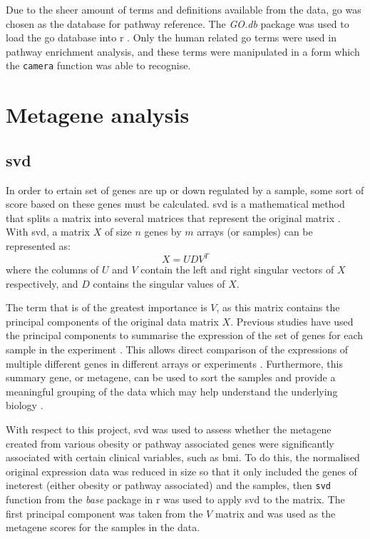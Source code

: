 Due to the sheer amount of terms and definitions available from the data, \gls{go} was chosen as the database for pathway reference.
The \textit{GO.db} package was used to load the \gls{go} database into \gls{r} \citep{Carlson2016}.
Only the human related \gls{go} terms were used in pathway enrichment analysis, and these terms were manipulated in a form which the \texttt{camera} function was able to recognise.

\section{Metagene analysis}
\label{sec:metagene_analysis}

\subsection{\Gls{svd}}
\label{sub:svd}

In order to ertain set of genes are up or down regulated by a sample, some sort of score based on these genes must be calculated.
\Gls{svd} is a mathematical method that splits a matrix into several matrices that represent the original matrix \citep{Golub1970}.
With \gls{svd}, a matrix $X$ of size $n$ genes by $m$ arrays (or samples) can be represented as:
\begin{equation}
	\label{eq:svd}
	X = UDV^T
\end{equation}
where the columns of $U$ and $V$ contain the left and right singular vectors of $X$ respectively, and $D$ contains the singular values of $X$.

The term that is of the greatest importance is $V$, as this matrix contains the principal components of the original data matrix $X$.
Previous studies have used the principal components to summarise the expression of the set of genes for each sample in the experiment \citep{Alter2000,West2001}.
This allows direct comparison of the expressions of multiple different genes in different arrays or experiments \citep{Alter2000}.
Furthermore, this summary gene, or metagene, can be used to sort the samples and provide a meaningful grouping of the data which may help understand the underlying biology \citep{Alter2000}.

With respect to this project, \gls{svd} was used to assess whether the metagene created from various obesity or pathway associated genes were significantly associated with certain clinical variables, such as \gls{bmi}.
To do this, the normalised original expression data was reduced in size so that it only included the genes of ineterest (either obesity or pathway associated) and the samples, then \texttt{svd} function from the \textit{base} package in \gls{r} was used to apply \gls{svd} to the matrix.
The first principal component was taken from the $V$ matrix and was used as the metagene scores for the samples in the data.

